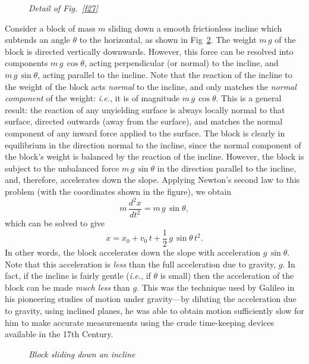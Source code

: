 \begin{figure}
\epsfysize=2in
\centerline{}
\caption{\em Detail of Fig.~\ref{f27}}\label{f28}   
\end{figure}

Consider a block of mass $m$ sliding down a smooth frictionless incline
which subtends an angle $\theta$ to the horizontal, as shown in Fig~\ref{f29}.
The weight $m\,g$ of the block is directed vertically downwards. However,
this force can be resolved into components $m\,g\,\cos\theta$, acting
perpendicular (or normal) to the incline, and  $m\,g\,\sin\theta$,
acting parallel to the incline. Note that the reaction of the incline
to the weight of the block acts {\em normal}\/ to the incline, and only
matches the {\em normal component}\/ of the weight: {\em i.e.}, it is
of magnitude $m\,g\,\cos\theta$. This is a general result: the reaction
of any unyielding surface is always locally
normal to that surface, directed outwards (away from the surface),
and matches the normal component of any inward force applied to the surface. 
The block is clearly in equilibrium in the direction normal to
the incline, since the normal component of the block's weight is balanced by
the reaction of the incline. However, the block is subject
to the unbalanced force $m\,g\,\sin\theta$ in the direction parallel
to the incline, and, therefore, accelerates down the slope.
Applying Newton's second law to this problem (with the coordinates shown
in the figure), we obtain
\begin{equation}
m\,\frac{d^2 x}{dt^2} = m\,g\,\sin\theta,
\end{equation}
which can be solved to give
\begin{equation}
x = x_0 + v_0\,t + \frac{1}{2}\,g\,\sin\theta\,t^2.
\end{equation}
In other words, the block accelerates down the slope with
acceleration $g\,\sin\theta$. Note that this acceleration
is {\em less} than the full acceleration due to gravity, $g$. In fact,
if the incline is fairly gentle ({\em i.e.}, if $\theta$ is small) then
the acceleration of the block can be made {\em much less} than $g$. 
This was the technique used by Galileo in his pioneering studies
of motion under gravity---by diluting the acceleration due to gravity,
using inclined planes, he was able to obtain motion sufficiently
slow for him to make accurate measurements using the crude time-keeping
devices available in the 17th Century.

\begin{figure}
\epsfysize=2in
\centerline{}
\caption{\em Block sliding down an incline}\label{f29}   
\end{figure}


